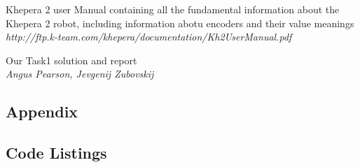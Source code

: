 \documentclass[11pt, a4paper]{article}
\begin{document}
\begin{thebibliography}{8}
\par{Khepera 2 user Manual containing all the fundamental information about the Khepera 2 robot, including information abotu encoders and their value meanings} \\
\textit{http://ftp.k-team.com/khepera/documentation/Kh2UserManual.pdf}


\par{Our Task1 solution and report} \\
\textit{Angus Pearson, Jevgenij Zubovskij}





\end{thebibliography}


\begin{appendices}
\section*{Appendix}
\subsection{Code Listings}









\end{appendices}
\end{document}
